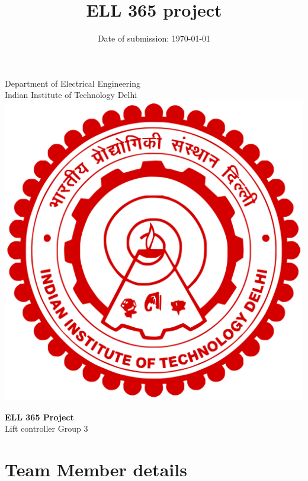 \documentclass{article}
\title{ELL 365 project}
\date{Date of submission: \today}
\begin{document}
\begin{titlepage}
\begin{center}
\Huge
Department of Electrical Engineering \\
\vspace{1mm}
\LARGE
Indian Institute of Technology Delhi\\
\vfill
\includegraphics[height=8 cm]{img/logo.png}
\end{center}
\vspace{5mm}
\begin{center}
\vfill
\huge
\textbf{ELL 365 Project\\}
\vspace{5mm}
Lift controller
\huge
\vfill
Group 3
\end{center}
\end{titlepage}
\tableofcontents
\pagebreak

\pagebreak

\section{Team Member details}
\end{document}
